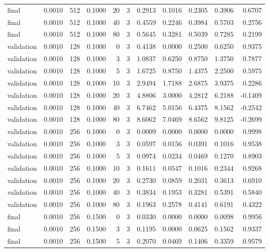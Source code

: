 \begin{tabular}{lrrrrrrrrrr}
final & 0.0010 & 512 & 0.1000 & 20 & 3 & 0.2913 & 0.1016 & 0.2305 & 0.3906 & 0.6707 \\
final & 0.0010 & 512 & 0.1000 & 40 & 3 & 0.4559 & 0.2246 & 0.3984 & 0.5703 & 0.2756 \\
final & 0.0010 & 512 & 0.1000 & 80 & 3 & 0.5645 & 0.3281 & 0.5039 & 0.7285 & 0.2199 \\
validation & 0.0010 & 128 & 0.1000 & 0 & 3 & 0.4138 & 0.0000 & 0.2500 & 0.6250 & 0.9375 \\
validation & 0.0010 & 128 & 0.1000 & 3 & 3 & 1.0837 & 0.6250 & 0.8750 & 1.3750 & 0.7877 \\
validation & 0.0010 & 128 & 0.1000 & 5 & 3 & 1.6725 & 0.8750 & 1.4375 & 2.2500 & 0.5975 \\
validation & 0.0010 & 128 & 0.1000 & 10 & 3 & 2.9494 & 1.7188 & 2.6875 & 3.9375 & 0.2286 \\
validation & 0.0010 & 128 & 0.1000 & 20 & 3 & 4.8806 & 3.0000 & 4.2812 & 6.2188 & -0.1409 \\
validation & 0.0010 & 128 & 0.1000 & 40 & 3 & 6.7462 & 5.0156 & 6.4375 & 8.1562 & -0.2542 \\
validation & 0.0010 & 128 & 0.1000 & 80 & 3 & 8.6062 & 7.0469 & 8.6562 & 9.8125 & -0.2699 \\
validation & 0.0010 & 256 & 0.1000 & 0 & 3 & 0.0009 & 0.0000 & 0.0000 & 0.0000 & 0.9998 \\
validation & 0.0010 & 256 & 0.1000 & 3 & 3 & 0.0597 & 0.0156 & 0.0391 & 0.1016 & 0.9538 \\
validation & 0.0010 & 256 & 0.1000 & 5 & 3 & 0.0974 & 0.0234 & 0.0469 & 0.1270 & 0.8903 \\
validation & 0.0010 & 256 & 0.1000 & 10 & 3 & 0.1611 & 0.0547 & 0.1016 & 0.2344 & 0.9268 \\
validation & 0.0010 & 256 & 0.1000 & 20 & 3 & 0.2730 & 0.0859 & 0.2031 & 0.3613 & 0.6910 \\
validation & 0.0010 & 256 & 0.1000 & 40 & 3 & 0.3834 & 0.1953 & 0.3281 & 0.5391 & 0.5840 \\
validation & 0.0010 & 256 & 0.1000 & 80 & 3 & 0.1963 & 0.2578 & 0.4141 & 0.6191 & 0.4322 \\
final & 0.0010 & 256 & 0.1500 & 0 & 3 & 0.0330 & 0.0000 & 0.0000 & 0.0098 & 0.9956 \\
final & 0.0010 & 256 & 0.1500 & 3 & 3 & 0.1195 & 0.0000 & 0.0625 & 0.1562 & 0.9337 \\
final & 0.0010 & 256 & 0.1500 & 5 & 3 & 0.2070 & 0.0469 & 0.1406 & 0.3359 & 0.9579 \\

\end{tabular}
